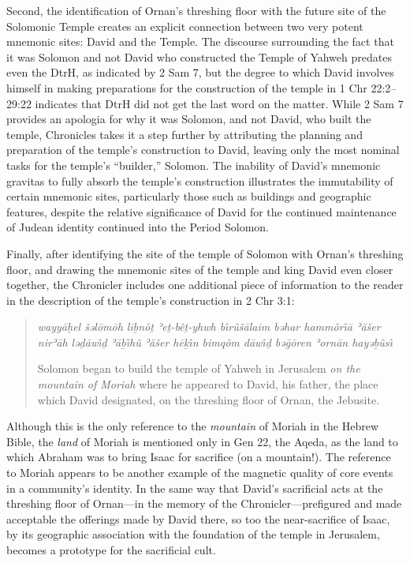 Second, the identification of Ornan's threshing floor with the future site of the Solomonic Temple creates an explicit connection between two very potent mnemonic sites: David and the Temple. The discourse surrounding the fact that it was Solomon and not David who constructed the Temple of Yahweh predates even the DtrH, as indicated by 2 Sam 7, but the degree to which David involves himself in making preparations for the construction of the temple in 1 Chr 22:2--29:22 indicates that DtrH did not get the last word on the matter. While 2 Sam 7 provides an apologia for why it was Solomon, and not David, who built the temple, Chronicles takes it a step further by attributing the planning and preparation of the temple's construction to David, leaving only the most nominal tasks for the temple's ``builder,'' Solomon. The inability of David's mnemonic gravitas to fully absorb the temple's construction illustrates the immutability of certain mnemonic sites, particularly those such as buildings and geographic features, despite the relative significance of David for the continued maintenance of Judean identity continued into the \secondtemple Period \visavis Solomon. 

 Finally, after identifying the site of the temple of Solomon with Ornan's threshing floor, and drawing the mnemonic sites of the temple and king David even closer together, the Chronicler includes one additional piece of information to the reader in the description of the temple's construction in 2 Chr 3:1: 

 \begin{quote} \emph{wayyāḥel šəlōmōh liḇnôṯ ʾeṯ-bêṯ-yhwh bı̂rûšālaim bəhar hammôrı̂ā ʾăšer nirʾāh ləḏāwı̂ḏ ʾāḇı̂hû ʾăšer hēḵı̂n bimqôm dāwı̂ḏ bəḡōren ʾornān hayəḇûsı̂} 

 Solomon began to build the temple of Yahweh in Jerusalem \emph{on the mountain of Moriah} where he appeared to David, his father, the place which David designated, on the threshing floor of Ornan, the Jebusite. \end{quote} 

 Although this is the only reference to the \emph{mountain} of Moriah in the Hebrew Bible, the \emph{land} of Moriah is mentioned only in Gen 22, the Aqeda, as the land to which Abraham was to bring Isaac for sacrifice (on a mountain!).\autocite[358--359]{kalimi_htr1990} The reference to Moriah appears to be another example of the magnetic quality of core events in a community's identity. In the same way that David's sacrificial acts at the threshing floor of Ornan---in the memory of the Chronicler---prefigured and made acceptable the offerings made by David there, so too the near-sacrifice of Isaac, by its geographic association with the foundation of the temple in Jerusalem, becomes a prototype for the sacrificial cult.\autocite[In fact, \vermes makes this point explicit and traces the tradition into early Christianity. See][204--211]{vermes1961} 

